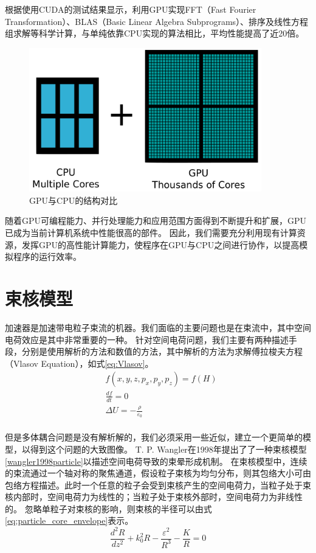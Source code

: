根据使用CUDA的测试结果显示，利用GPU实现FFT（Fast Fourier Transformation）、BLAS（Basic Linear Algebra Subprograms）、排序及线性方程组求解等科学计算，与单纯依靠CPU实现的算法相比，平均性能提高了近20倍。
\begin{figure}[!htb]
    \centering
    \includegraphics[width=0.9\textwidth]{plot/GPU_vs_CPU.png}
    \caption{GPU与CPU的结构对比}
    \label{fig:GPU}
\end{figure}

随着GPU可编程能力、并行处理能力和应用范围方面得到不断提升和扩展，GPU已成为当前计算机系统中性能很高的部件。
因此，我们需要充分利用现有计算资源，发挥GPU的高性能计算能力，使程序在GPU与CPU之间进行协作，以提高模拟程序的运行效率。



\section{束核模型}
加速器是加速带电粒子束流的机器。我们面临的主要问题也是在束流中，其中空间电荷效应是其中非常重要的一种。
针对空间电荷问题，我们主要有两种描述手段，分别是使用解析的方法和数值的方法，其中解析的方法为求解傅拉梭夫方程（Vlasov Equation），如式\ref{eq:Vlasov}。
\begin{equation}
    \label{eq:Vlasov}
    \begin{aligned}
        & f(x,y,z,{{p}_{x}},{{p}_{y}},{{p}_{z}})=f(H) \\
        & \frac{df}{dt}=0 \\
        & \Delta U=-\frac{\rho }{{{\varepsilon }_{0}}} \\
    \end{aligned}
\end{equation}

但是多体耦合问题是没有解析解的，我们必须采用一些近似，建立一个更简单的模型，以得到这个问题的大致图像。
T. P. Wangler在1998年提出了了一种束核模型\ref{wangler1998particle}以描述空间电荷导致的束晕形成机制。
在束核模型中，连续的束流通过一个轴对称的聚焦通道，假设粒子束核为均匀分布，则其包络大小可由包络方程描述。此时一个任意的粒子会受到束核产生的空间电荷力，当粒子处于束核内部时，空间电荷力为线性的；当粒子处于束核外部时，空间电荷力为非线性的。
忽略单粒子对束核的影响，则束核的半径可以由式\ref{eq:particle_core_envelope}表示。
\begin{equation}
    \label{eq:particle_core_envelope}
    \frac{{{d}^{2}}R}{d{{z}^{2}}}+k_{0}^{2}R-\frac{{{\varepsilon }^{2}}}{{{R}^{3}}}-\frac{K}{R}=0
\end{equation}

